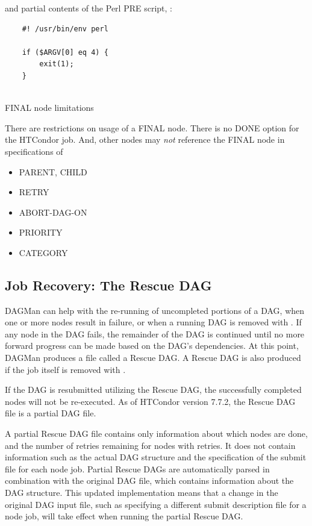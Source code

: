 and partial contents of the Perl PRE script, :
\begin{verbatim}
    #! /usr/bin/env perl
    
    if ($ARGV[0] eq 4) {
        exit(1);
    }
   
\end{verbatim}


\begin{description}
\item[FINAL node limitations]
\end{description}

There are restrictions on usage of a FINAL node.
There is no DONE option for the HTCondor job.
And, other nodes may \emph{not} reference the FINAL node in specifications of 
\begin{itemize}
\item PARENT, CHILD
\item RETRY
\item ABORT-DAG-ON
\item PRIORITY
\item CATEGORY
\end{itemize}

\subsection{\label{sec:DAGMan-rescue}Job Recovery:  The Rescue DAG}

DAGMan can help with the re-running of uncompleted portions of a DAG, 
when one or more nodes result in failure,
or when a running DAG is removed with .
If any node in the DAG fails,
the remainder of the DAG is continued until no more forward
progress can be made based on the DAG's dependencies.
At this point, DAGMan produces a file called a Rescue DAG.  
A Rescue DAG is also produced if the
 job itself is removed with .

If the DAG is resubmitted utilizing the Rescue DAG,
the successfully completed nodes will not be re-executed.
As of HTCondor version 7.7.2, the Rescue DAG file is a partial DAG file. 

A partial Rescue DAG file contains only information about which nodes are done,
and the number of retries remaining for nodes with retries.  
It does not contain information such as the actual
DAG structure and the specification of the submit file for each node job.  
Partial Rescue DAGs are automatically parsed in combination with
the original DAG file, 
which contains information about the DAG structure.  
This updated implementation means that a change in the original DAG input file,
such as specifying a different submit description file for a node job,
will take effect when running the partial Rescue DAG.

